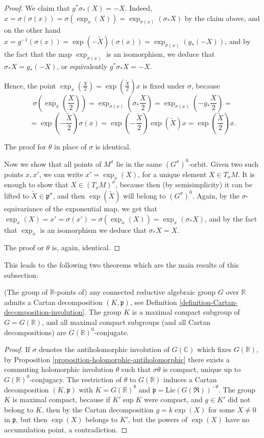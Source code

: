 \begin{proof}
We claim that $g^*\sigma_*(X) = -X$. Indeed, $x = \sigma(\sigma(x)) =\sigma (\exp_x (X)) = \exp_{\sigma(x)} (\sigma_* X)$ by the claim above, and on the other hand $x = g^{-1}(\sigma(x)) = \exp(-\tilde X) (\sigma (x)) = \exp_{\sigma(x)} (g_*(-X))$, and by the fact that the map $\exp_{\sigma(x)}$ is an isomorphism, we deduce that $\sigma_* X = g_*(-X)$, or equivalently $g^*\sigma_* X = -X$.

Hence, the point $\exp_x (\frac{X}{2}) = \exp(\frac{\tilde X}{2}) x$ is fixed under $\sigma$, because 
$$\sigma (\exp_x (\frac{X}{2})) = \exp_{\sigma(x)} (\sigma_* \frac{X}{2}) = \exp_{\sigma(x)} (- g_* \frac{X}{2})=$$
$$= \exp(-\frac{\tilde X}{2}) \sigma (x) = \exp(-\frac{\tilde X}{2}) \exp(\tilde X) x = \exp(\frac{\tilde X}{2}) x.$$ 

The proof for $\theta$ in place of $\sigma$ is identical. 


Now we show that all points of $M^\sigma$ lie in the same $(G^\sigma)^0$-orbit. Given two such points $x, x'$, we can write $x' = \exp_x(X)$, for a unique element $X\in T_x M$. It is enough to show that $X \in (T_x M)^\sigma$, because then (by semisimplicity) it can be lifted to $\tilde X \in \mathfrak p^\sigma$, and then $\exp(\tilde X)$ will belong to $(G^\sigma)^0$. Again, by the $\sigma$-equivariance of the exponential map, we get that $\exp_x(X) = x' = \sigma(x') = \sigma(\exp_x(X)) = \exp_x (\sigma_* X)$, and by the fact that $\exp_x$ is an isomorphism we deduce that $\sigma_*X = X$.

The proof or $\theta$ is, again, identical.

\end{proof}

This leads to the following two theorems which are the main results of this subsection:

\begin{theorem}
 \label{theorem-Cartan-involution-exists}
(The group of $\mathbb R$-points of) any connected reductive algebraic group $G$ over $\mathbb R$ admits a Cartan decomposition $(K,\mathfrak p)$, see Definition \ref{definition-Cartan-decomposition-involution}. The group $K$ is a maximal compact subgroup of $G=G(\mathbb R)$, and all maximal compact subgroups (and all Cartan decompositions) are $G(\mathbb R)^0$-conjugate. 
\end{theorem}

\begin{proof}
 If $\sigma$ denotes the antiholomorphic involution of $G(\mathbb C)$ which fixes $G(\mathbb R)$, by  Proposition \ref{proposition-holomorphic-antiholomorphic} there exists a commuting holomorphic involution $\theta$ such that $\sigma\theta$ is compact, unique up to $G(\mathbb R)^0$-conjugacy. The restriction of $\theta$ to $G(\mathbb R)$ induces a Cartan decomposition $(K, \mathfrak p)$ with $K = G(\mathbb R)^\theta$ and $\mathfrak p = \text{Lie}(G(\mathfrak R))^{-\theta}$. The group $K$ is maximal compact, because if $K'\sup K$ were compact, and $g \in K'$ did not belong to $K$, then by the Cartan decomposition $g = k\exp(X)$ for some $X\ne 0$ in $\mathfrak p$, but then $\exp(X)$ belongs to $K'$, but the powers of $\exp(X)$ have no accumulation point, a contradiction.
\end{proof}

